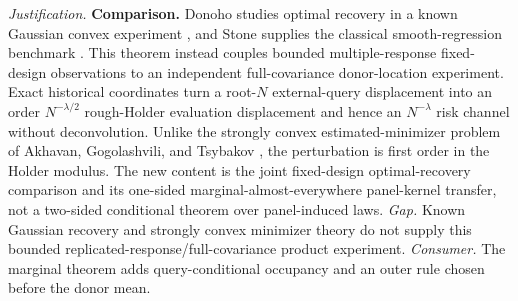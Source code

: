 \documentclass{article}
\begin{document}
\par\smallskip\noindent \textit{Justification.} \textbf{Comparison.} Donoho studies optimal recovery in a known Gaussian convex experiment \cite{Donoho1994}, and Stone supplies the classical smooth-regression benchmark \cite{Stone1982}. This theorem instead couples bounded multiple-response fixed-design observations to an independent full-covariance donor-location experiment. Exact historical coordinates turn a root-\(N\) external-query displacement into an order \(N^{-\lambda/2}\) rough-Holder evaluation displacement and hence an \(N^{-\lambda}\) risk channel without deconvolution. Unlike the strongly convex estimated-minimizer problem of Akhavan, Gogolashvili, and Tsybakov \cite{AkhavanGogolashviliTsybakov2024}, the perturbation is first order in the Holder modulus. The new content is the joint fixed-design optimal-recovery comparison and its one-sided marginal-almost-everywhere panel-kernel transfer, not a two-sided conditional theorem over panel-induced laws. \textit{Gap.} Known Gaussian recovery and strongly convex minimizer theory do not supply this bounded replicated-response/full-covariance product experiment. \textit{Consumer.} The marginal theorem adds query-conditional occupancy and an outer rule chosen before the donor mean.
\end{document}
